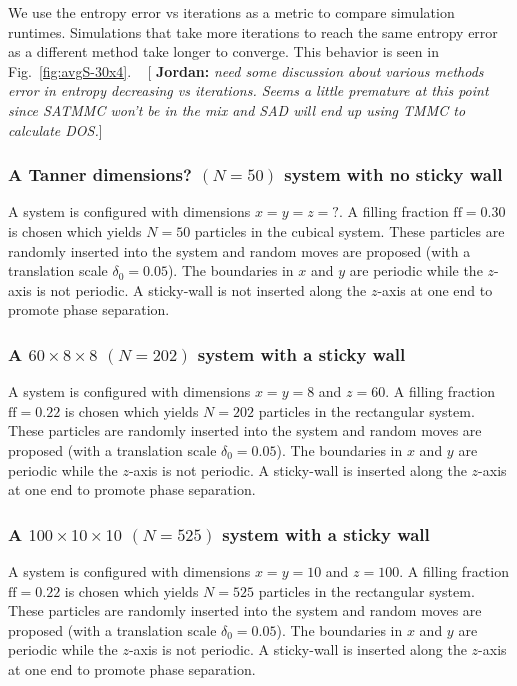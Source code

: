 \documentclass[letterpaper,twocolumn,amsmath,amssymb,pre,aps,10pt]{revtex4-1}
\newcommand{\blue}[1]{{\bf \color{blue} #1}}
\newcommand{\jpsays}[1]{{\color{red} [\blue{Jordan:} \emph{#1}]}}
\begin{document}
We use the entropy error vs iterations as a metric to compare
simulation runtimes.  Simulations that take more iterations to reach
the same entropy error as a different method take longer to converge.
This behavior is seen in Fig.~\ref{fig:avgS-30x4}.
~\jpsays{need some discussion about various methods error in entropy decreasing
vs iterations.  Seems a little premature at this point since SATMMC won't be in
the mix and SAD will end up using TMMC to calculate DOS.}

\subsubsection{A Tanner dimensions? $(N = 50)$ system with no sticky
wall}

A system is configured with dimensions $x = y = z = ?$.  A
filling fraction $\text{ff} = 0.30$ is chosen which yields $N = 50$
particles in the cubical system.  These particles are randomly
inserted into the system and random moves are proposed (with a
translation scale $\delta_0 = 0.05$). The boundaries in $x$ and $y$ are
periodic while the $z$-axis is not periodic.  A sticky-wall is not inserted
along the $z$-axis at one end to promote phase separation.

\subsubsection{A $60\times8\times8$ $(N = 202)$ system with a sticky
wall}

A system is configured with dimensions $x = y = 8$ and $z = 60$.  A
filling fraction $\text{ff} = 0.22$ is chosen which yields $N = 202$
particles in the rectangular system.  These particles are randomly
inserted into the system and random moves are proposed (with a
translation scale $\delta_0 = 0.05$). The boundaries in $x$ and $y$ are
periodic while the $z$-axis is not periodic.  A sticky-wall is inserted
along the $z$-axis at one end to promote phase separation.

\subsubsection{A $100\times10\times10$ $(N = 525)$ system with a sticky
wall}

A system is configured with dimensions $x = y = 10$ and $z = 100$.  A
filling fraction $\text{ff} = 0.22$ is chosen which yields $N = 525$
particles in the rectangular system.  These particles are randomly
inserted into the system and random moves are proposed (with a
translation scale $\delta_0 = 0.05$). The boundaries in $x$ and $y$ are
periodic while the $z$-axis is not periodic.  A sticky-wall is inserted
along the $z$-axis at one end to promote phase separation.
\end{document}
